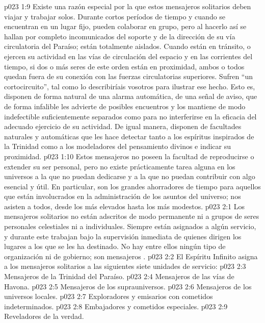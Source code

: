 \vs p023 1:9 \pc Existe una razón especial por la que estos mensajeros solitarios deben viajar y trabajar solos. Durante cortos períodos de tiempo y cuando se encuentran en un lugar fijo, pueden colaborar en grupo, pero al hacerlo así se hallan por completo incomunicados del soporte y de la dirección de su vía circulatoria del Paraíso; están totalmente aislados. Cuando están en tránsito, o ejercen su actividad en las vías de circulación del espacio y en las corrientes del tiempo, si dos o más seres de este orden están en proximidad, ambos o todos quedan fuera de su conexión con las fuerzas circulatorias superiores. Sufren “un cortocircuito”, tal como lo describiríais vosotros para ilustrar ese hecho. Esto es, disponen de forma natural de una alarma automática, de una señal de aviso, que de forma infalible les advierte de posibles encuentros y los mantiene de modo indefectible suficientemente separados como para no interferirse en la eficacia del adecuado ejercicio de su actividad. De igual manera, disponen de facultades naturales y automáticas que les hace detectar tanto a los espíritus inspirados de la Trinidad como a los modeladores del pensamiento divinos e indicar su proximidad.
\vs p023 1:10 \pc Estos mensajeros no poseen la facultad de reproducirse o extender su ser personal, pero no existe prácticamente tarea alguna en los universos a la que no puedan dedicarse y a la que no puedan contribuir con algo esencial y útil. En particular, son los grandes ahorradores de tiempo para aquellos que están involucrados en la administración de los asuntos del universo; nos asisten a todos, desde los más elevados hasta los más modestos.
\vs p023 2:1 Los mensajeros solitarios no están adscritos de modo permanente ni a grupos de seres personales celestiales ni a individuales. Siempre están asignados a algún servicio, y durante este trabajan bajo la supervisión inmediata de quienes dirigen los lugares a los que se les ha destinado. No hay entre ellos ningún tipo de organización ni de gobierno; son mensajeros .
\vs p023 2:2 \pc El Espíritu Infinito asigna a los mensajeros solitarios a las siguientes siete unidades de servicio:
\vs p023 2:3 Mensajeros de la Trinidad del Paraíso.
\vs p023 2:4 Mensajeros de las vías de Havona.
\vs p023 2:5 Mensajeros de los suprauniversos.
\vs p023 2:6 Mensajeros de los universos locales.
\vs p023 2:7 Exploradores y emisarios con cometidos indeterminados.
\vs p023 2:8 Embajadores y cometidos especiales.
\vs p023 2:9 Reveladores de la verdad.
